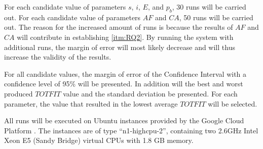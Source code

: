 For each candidate value of parameters $s$, $i$, $E$, and $p_b$, 30 runs will be carried out. For each candidate value of parameters $AF$ and $CA$, 50 runs will be carried out. The reason for the increased amount of runs is because the results of $AF$ and $CA$ will contribute in establishing \vref{itm:RQ2}. By running the system with additional runs, the margin of error will most likely decrease and will thus increase the validity of the results.

For all candidate values, the margin of error of the Confidence Interval with a confidence level of 95\% will be presented. In addition will the best and worst produced $TOTFIT$ value and the standard deviation be presented. For each parameter, the value that resulted in the lowest average $TOTFIT$ will be selected. 

All runs will be executed on Ubuntu instances provided by the Google Cloud Platform \citep{website:google}. The instances are of type ``n1-highcpu-2'', containing two 2.6GHz Intel Xeon E5 (Sandy Bridge) virtual CPUs with 1.8 GB memory. 

